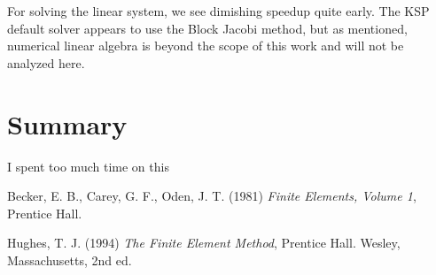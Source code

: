 \documentclass[12pt,notitlepage]{extreport}
\begin{document}
For solving the linear system, we see dimishing speedup quite early. The KSP default solver appears to use the Block Jacobi method, but as mentioned, numerical linear algebra is beyond the scope of this work and will not be analyzed here.

\section*{Summary}
I spent too much time on this

\begin{thebibliography}{3}
Becker, E. B., Carey, G. F., Oden, J. T. (1981) \emph{Finite Elements, Volume 1}, Prentice Hall.

Hughes, T. J. (1994) \emph{The Finite Element Method}, Prentice Hall.
Wesley, Massachusetts, 2nd ed.
\end{thebibliography}
\end{document}
